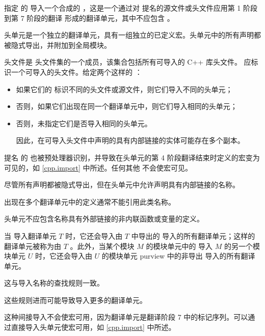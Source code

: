 \pnum
指定   的  导入一个合成的 ，这是一个通过对  提名的源文件或头文件应用第 1 阶段到第 7 阶段的翻译 形成的翻译单元，其中不应包含 。
\begin{note}
头单元是一个独立的翻译单元，具有一组独立的已定义宏。头单元中的所有声明都被隐式导出，并附加到全局模块。
\end{note}
 头文件是
头文件集的一个成员，该集合包括所有可导入的 C++ 库头文件。 应标识一个可导入的头文件。给定两个这样的 ：
\begin{itemize}
\item
如果它们的  标识不同的头文件或源文件，则它们导入不同的头单元；
\item
否则，如果它们出现在同一个翻译单元中，则它们导入相同的头单元；
\item
否则，未指定它们是否导入相同的头单元。
\begin{note}
因此，在可导入头文件中声明的具有内部链接的实体可能存在多个副本。
\end{note}
\end{itemize}
\begin{note}
提名  的  也被预处理器识别，并导致在头单元的第 4 阶段翻译结束时定义的宏变为可见的，如 \ref{cpp.import} 中所述。任何其他  不会使宏可见。
\end{note}

\pnum
尽管所有声明都被隐式导出，但在头单元中允许声明具有内部链接的名称。
\begin{note}
出现在多个翻译单元中的定义通常不能引用此类名称。
\end{note}
头单元不应包含名称具有外部链接的非内联函数或变量的定义。


\pnum
当  导入翻译单元 $T$ 时，它还会导入由 $T$ 中导出的  导入的所有翻译单元；这样的翻译单元被称为由 $T$ 。此外，当某个模块 $M$ 的模块单元中的  导入 $M$ 的另一个模块单元 $U$ 时，它还会导入由 $U$ 的模块单元 purview 中的非导出  导入的所有翻译单元。
\begin{footnote}
这与导入名称的查找规则一致。
\end{footnote}
这些规则进而可能导致导入更多的翻译单元。
\begin{note}
这种间接导入不会使宏可用，因为翻译单元是翻译阶段 7 中的标记序列。可以通过直接导入头单元使宏可用，如 \ref{cpp.import} 中所述。
\end{note}

